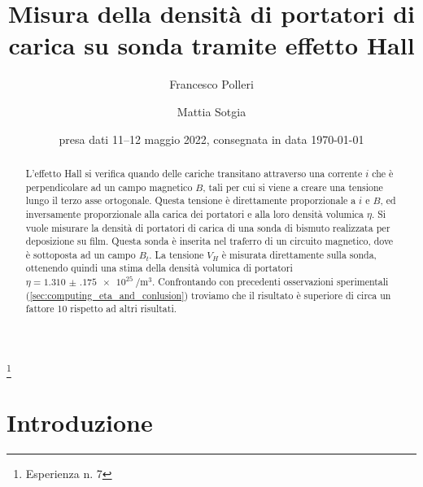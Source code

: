 \documentclass[
    prl,
    reprint, 
    superscriptaddress, 
    altaffilletter, 
    amsmath, 
    amssymb, 
    a4paper,
    varvw]{revtex4-2}
\begin{document}
\title{Misura della densità di portatori di carica su sonda tramite effetto Hall
}
\thanks{Esperienza n. 7
}

\author{Francesco Polleri}
\author{Mattia Sotgia}



\date{presa dati
    11--12 maggio 2022, consegnata in data 
    \today
}

\begin{abstract}
    L'effetto Hall si verifica quando delle cariche transitano attraverso una corrente $i$ che è perpendicolare ad un campo magnetico $B$, tali per cui si viene a creare una tensione lungo il terzo asse ortogonale. Questa tensione è direttamente proporzionale a $i$ e $B$, ed inversamente proporzionale alla carica dei portatori e alla loro densità volumica $\eta$.
    Si vuole misurare la densità di portatori di carica di una sonda di bismuto  realizzata per deposizione su film. Questa sonda è inserita nel traferro di un circuito magnetico, dove è sottoposta ad un campo $B_t$. La tensione $V_H$ è misurata direttamente sulla sonda, ottenendo quindi una stima della densità volumica di portatori $\eta=\SI{1.310(175)e+25}{\per\cubic\metre}$. Confrontando con precedenti osservazioni sperimentali (\ref{sec:computing_eta_and_conlusion}) troviamo che il risultato è superiore di circa un fattore 10 rispetto ad altri risultati.
\end{abstract}


\maketitle
\thispagestyle{fancy}


\section{Introduzione}
\end{document}
